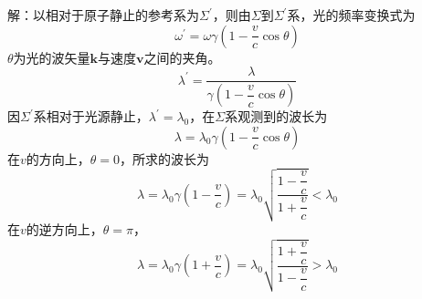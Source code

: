 \documentclass[12pt,a4paper]{article}
\renewcommand{\vec}[1]{\boldsymbol{#1}}
\begin{document}
解：以相对于原子静止的参考系为$\Sigma^{\prime}$，则由$\Sigma$到$\Sigma^{\prime}$系，光的频率变换式为
\begin{equation*}
\omega^{\prime} = \omega \gamma  \left(1-\frac{v}{c} \cos \theta \right)
\end{equation*}
$\theta$为光的波矢量$\vec{k}$与速度$\vec{v}$之间的夹角。
\begin{equation*}
\lambda^{\prime} = \frac{\lambda}{\gamma \left(1-\dfrac{v}{c} \cos \theta \right) }
\end{equation*}
因$\Sigma^{\prime}$系相对于光源静止，$\lambda^{\prime} = \lambda_0$，在$\Sigma$系观测到的波长为
\begin{equation*}
\lambda = \lambda_0 \gamma \left(1-\dfrac{v}{c} \cos \theta \right)
\end{equation*}
在$v$的方向上，$\theta = 0$，所求的波长为
\begin{equation*}
\lambda = \lambda_0 \gamma \left(1-\dfrac{v}{c} \right) = \lambda_0 \sqrt{\frac{1-\dfrac{v}{c}}{1+\dfrac{v}{c}} }< \lambda_0
\end{equation*}
在$v$的逆方向上，$\theta = \pi$，
\begin{equation*}
\lambda = \lambda_0 \gamma \left(1+\dfrac{v}{c} \right) = \lambda_0 \sqrt{\frac{1+\dfrac{v}{c}}{1-\dfrac{v}{c}} }> \lambda_0
\end{equation*}
\end{document}
